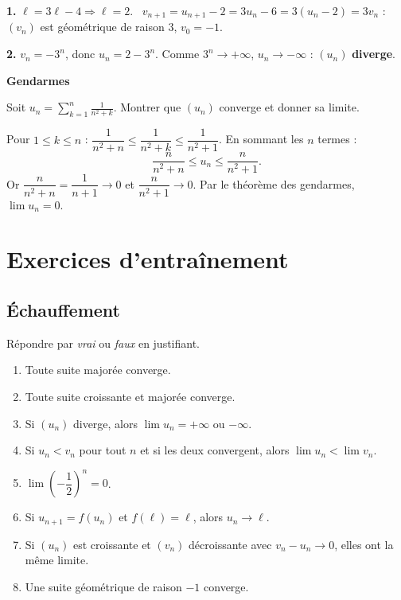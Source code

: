\solution

\textbf{1.} $\ell=3\ell-4\Rightarrow \ell=2$. \
$v_{n+1}=u_{n+1}-2=3u_n-6=3(u_n-2)=3v_n$ : $(v_n)$ est géométrique de
raison $3$, $v_0=-1$.

\textbf{2.} $v_n=-3^{n}$, donc $u_n=2-3^{n}$. Comme $3^{n}\to+\infty$,
$u_n\to-\infty$ : $(u_n)$ \textbf{diverge}.

\bigskip
\exerciceresolu
\textbf{Gendarmes}

Soit $u_n=\displaystyle\sum_{k=1}^{n}\frac{1}{n^{2}+k}$.
Montrer que $(u_n)$ converge et donner sa limite.

\solution

Pour $1\leq k\leq n$ : $\dfrac{1}{n^{2}+n}\leq\dfrac{1}{n^{2}+k}\leq\dfrac{1}{n^{2}+1}$.
En sommant les $n$ termes :
\[
\frac{n}{n^{2}+n}\leq u_n\leq\frac{n}{n^{2}+1}.
\]
Or $\dfrac{n}{n^{2}+n}=\dfrac{1}{n+1}\to 0$ et $\dfrac{n}{n^{2}+1}\to 0$.
Par le théorème des gendarmes, $\displaystyle\lim u_n=0$.


\section{Exercices d'entraînement}

\subsection{Échauffement}

Répondre par \emph{vrai} ou \emph{faux} en justifiant.
\begin{enumerate}
	\item Toute suite majorée converge.
	\item Toute suite croissante et majorée converge.
	\item Si $(u_n)$ diverge, alors $\lim u_n=+\infty$ ou $-\infty$.
	\item Si $u_n<v_n$ pour tout $n$ et si les deux convergent, alors
	$\lim u_n<\lim v_n$.
	\item $\lim\left(-\dfrac12\right)^{n}=0$.
	\item Si $u_{n+1}=f(u_n)$ et $f(\ell)=\ell$, alors $u_n\to\ell$.
	\item Si $(u_n)$ est croissante et $(v_n)$ décroissante avec
	$v_n-u_n\to 0$, elles ont la même limite.
	\item Une suite géométrique de raison $-1$ converge.
\end{enumerate}

